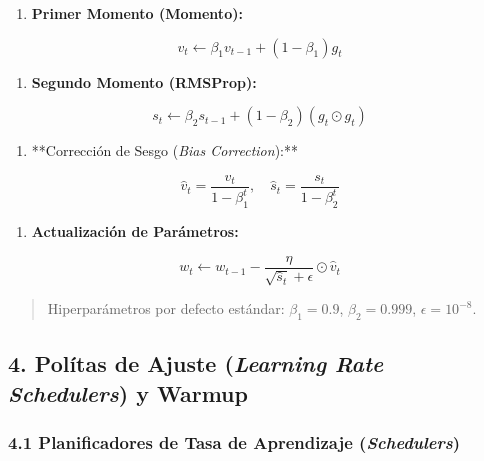 \documentclass[11pt,oneside]{article}
\begin{document}
\begin{enumerate}

\item \textbf{Primer Momento (Momento):}

\end{enumerate}

\[v_t \leftarrow \beta_1 v_{t-1} + (1 - \beta_1) g_t\]

\begin{enumerate}

\item \textbf{Segundo Momento (RMSProp):}

\end{enumerate}

\[s_t \leftarrow \beta_2 s_{t-1} + (1 - \beta_2) (g_t \odot g_t)\]

\begin{enumerate}

\item **Corrección de Sesgo (\emph{Bias Correction}):**

\end{enumerate}

\[\hat{v}_t = \frac{v_t}{1 - \beta_1^t}, \quad \hat{s}_t = \frac{s_t}{1 - \beta_2^t}\]

\begin{enumerate}

\item \textbf{Actualización de Parámetros:}

\end{enumerate}

\[w_t \leftarrow w_{t-1} - \frac{\eta}{\sqrt{\hat{s}_t} + \epsilon} \odot \hat{v}_t\]

\begin{quote}Hiperparámetros por defecto estándar: \(\beta_1 = 0.9\), \(\beta_2 = 0.999\), \(\epsilon = 10^{-8}\).\end{quote}

\begin{quote}\end{quote}

\begin{quote}\end{quote}

\subsection{4. Polítas de Ajuste (\emph{Learning Rate Schedulers}) y Warmup}

\subsubsection{4.1 Planificadores de Tasa de Aprendizaje (\emph{Schedulers})}
\end{document}
